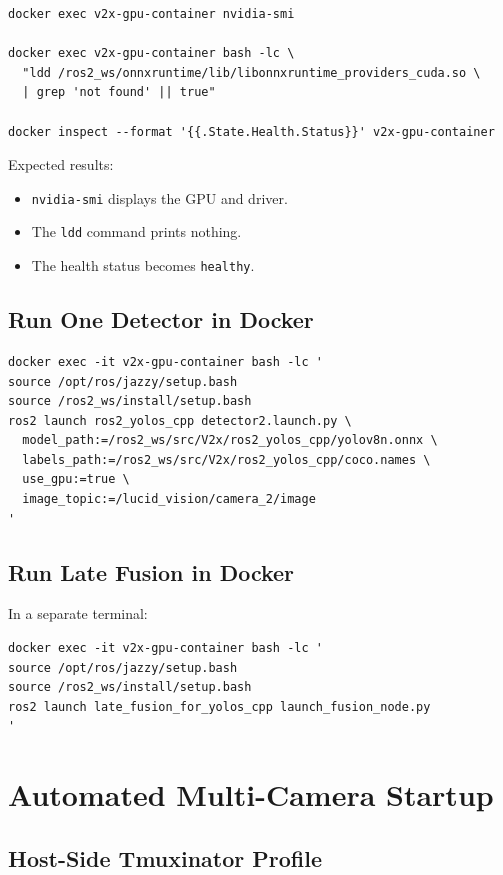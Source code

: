 \documentclass[11pt,a4paper]{article}
\begin{document}
\begin{lstlisting}
docker exec v2x-gpu-container nvidia-smi

docker exec v2x-gpu-container bash -lc \
  "ldd /ros2_ws/onnxruntime/lib/libonnxruntime_providers_cuda.so \
  | grep 'not found' || true"

docker inspect --format '{{.State.Health.Status}}' v2x-gpu-container
\end{lstlisting}

Expected results:

\begin{itemize}
  \item \texttt{nvidia-smi} displays the GPU and driver.
  \item The \texttt{ldd} command prints nothing.
  \item The health status becomes \texttt{healthy}.
\end{itemize}

\subsection{Run One Detector in Docker}

\begin{lstlisting}
docker exec -it v2x-gpu-container bash -lc '
source /opt/ros/jazzy/setup.bash
source /ros2_ws/install/setup.bash
ros2 launch ros2_yolos_cpp detector2.launch.py \
  model_path:=/ros2_ws/src/V2x/ros2_yolos_cpp/yolov8n.onnx \
  labels_path:=/ros2_ws/src/V2x/ros2_yolos_cpp/coco.names \
  use_gpu:=true \
  image_topic:=/lucid_vision/camera_2/image
'
\end{lstlisting}

\subsection{Run Late Fusion in Docker}

In a separate terminal:

\begin{lstlisting}
docker exec -it v2x-gpu-container bash -lc '
source /opt/ros/jazzy/setup.bash
source /ros2_ws/install/setup.bash
ros2 launch late_fusion_for_yolos_cpp launch_fusion_node.py
'
\end{lstlisting}

\section{Automated Multi-Camera Startup}

\subsection{Host-Side Tmuxinator Profile}
\end{document}
